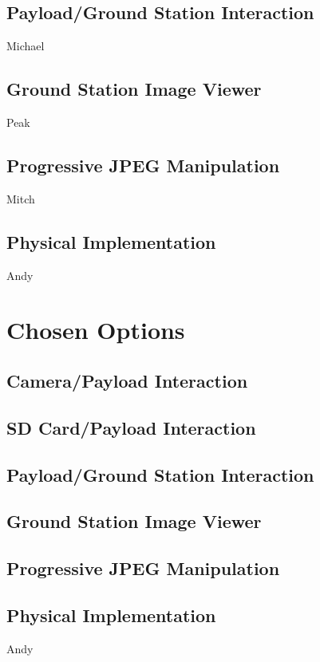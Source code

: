 \documentclass[oneside]{ecsgdp}         %
\begin{document}
\subsection{Payload/Ground Station Interaction}
Michael

\subsection{Ground Station Image Viewer}
Peak

\subsection{Progressive JPEG Manipulation}
Mitch

\subsection{Physical Implementation}
Andy

\section{Chosen Options}


\subsection{Camera/Payload Interaction}

\subsection{SD Card/Payload Interaction}

\subsection{Payload/Ground Station Interaction}

\subsection{Ground Station Image Viewer}

\subsection{Progressive JPEG Manipulation}

\subsection{Physical Implementation}
Andy
\end{document}
